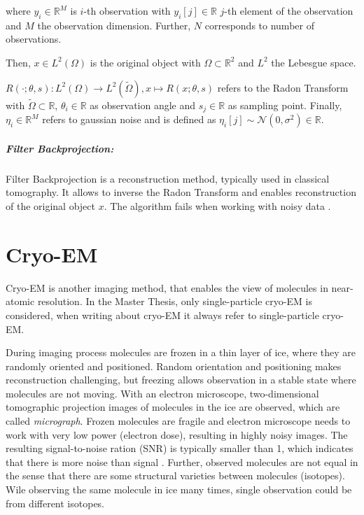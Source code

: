 where $y_i \in \mathbb{R}^M$ is $i$-th observation with $y_i[j] \in \mathbb{R}$ $j$-th element of the observation
and $M$ the observation dimension. 
Further, $N$ corresponds to number of observations.

Then, $x \in L^2(\Omega)$ is the original object with $\Omega \subset \mathbb{R}^2 $ and $L^2$ the Lebesgue space.

$R(\cdot; \theta, s): L^2(\Omega) \to L^2(\tilde{\Omega}) , x \mapsto R(x; \theta,s)$ refers to the Radon Transform \cite{radonTransform} 
with $\tilde{\Omega} \subset \mathbb{R}$, $\theta_i \in \mathbb{R}$ as observation angle and $s_j \in \mathbb{R}$ 
as sampling point. Finally, $\eta_i \in \mathbb{R}^M$ refers to gaussian noise and 
is defined as $\eta_i[j] \sim \mathcal{N}(0,\sigma^2) \in \mathbb{R}$.

\subparagraph{Filter Backprojection:}
Filter Backprojection \cite{tomographicReconstruction} is a reconstruction method, typically used in classical tomography.
It allows to inverse the Radon Transform and enables reconstruction of the original object $x$. 
The algorithm fails when working with noisy data \cite{cryoEmMath2}.

\section{Cryo-EM}
Cryo-EM is another imaging method, that enables the view of molecules in near-atomic resolution.
In the Master Thesis, only single-particle cryo-EM \cite{singleParticleCryoEm} is considered, when writing about cryo-EM it always refer to single-particle cryo-EM.

During imaging process molecules are frozen in a thin layer of ice, where they are randomly oriented and positioned. 
Random orientation and positioning makes reconstruction challenging, 
but freezing allows observation in a stable state where molecules are not moving.
With an electron microscope, two-dimensional tomographic projection images of molecules in the ice are observed,
which are called \textit{micrograph}. 
Frozen molecules are fragile and electron microscope needs to work with
very low power (electron dose), resulting in highly noisy images. The resulting signal-to-noise ration (SNR)
is typically smaller than 1, which indicates that there is more noise than signal \cite{cryoEmMath2}.
Further, observed molecules are not equal in the sense that there are some structural varieties between
molecules (isotopes). Wile observing the same molecule in ice many times, single observation could be from different isotopes.


